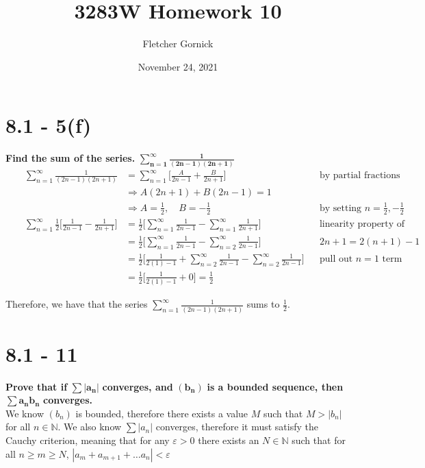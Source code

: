 \documentclass[11pt]{article}
\title{3283W Homework 10}
\author{Fletcher Gornick}
\date{November 24, 2021}
\begin{document}
\maketitle
\section*{8.1 - 5(f)}
\textbf{Find the sum of the series.} \quad 
\(\mathbf{\displaystyle\sum_{n=1}^{\infty} \frac{1}{(2n-1)(2n+1)}}\)
\begin{align*}
  && \displaystyle\sum_{n=1}^{\infty} \frac{1}{(2n-1)(2n+1)} &= 
  \displaystyle\sum_{n=1}^{\infty} \Big[\frac{A}{2n-1} + \frac{B}{2n+1} \Big] && 
  \text{by partial fractions} \\
  && &\Rightarrow A(2n+1) + B(2n-1) = 1 && \\
  && &\Rightarrow A = \frac12, \quad B = -\frac12 && \text{by setting $n=\frac12,-\frac12$} \\ 
  && \displaystyle\sum_{n=1}^{\infty} \frac12\Big[\frac{1}{2n-1} - \frac{1}{2n+1} \Big] &= 
  \frac12 \Big[\displaystyle\sum_{n=1}^{\infty} \frac{1}{2n-1} - 
  \displaystyle\sum_{n=1}^{\infty} \frac{1}{2n+1} \Big] && \text{linearity property of summations} \\
  && &= \frac12 \Big[\displaystyle\sum_{n=1}^{\infty} \frac{1}{2n-1} -
  \displaystyle\sum_{n=2}^{\infty} \frac{1}{2n-1} \Big] && 2n+1 = 2(n+1)-1 \\
  && &= \frac12 \Big[\frac{1}{2(1)-1} + \displaystyle\sum_{n=2}^{\infty} \frac{1}{2n-1} - 
  \displaystyle\sum_{n=2}^{\infty} \frac{1}{2n-1} \Big] && \text{pull out $n=1$ term} \\
  && &= \displaystyle\frac{1}{2}\Big[\frac{1}{2(1)-1} + 0 \Big] = \displaystyle\frac{1}{2}
\end{align*}

Therefore, we have that the series \(\displaystyle\sum_{n=1}^{\infty} \frac{1}{(2n-1)(2n+1)}\) sums to 
\(\displaystyle\frac{1}{2}\).
\newpage

\section*{8.1 - 11}
\textbf{Prove that if} \(\mathbf{\sum |a_n|}\) \textbf{converges, and} \(\mathbf{(b_n)}\)
\textbf{is a bounded sequence, then} \(\mathbf{\sum a_n b_n}\) \textbf{converges.} \\

We know \((b_n)\) is bounded, therefore there exists a value \(M\) such that \(M > |b_n|\) for all 
\(n \in \mathbb N\).  We also know \(\sum |a_n|\) converges, therefore it must satisfy the 
Cauchy criterion, meaning that for any \(\varepsilon > 0\) there exists an \(N \in \mathbb N\) such that 
for all \(n \geq m \geq N\), \(|a_m + a_{m+1} + \dots a_n| < \varepsilon\) \\ 
\end{document}
